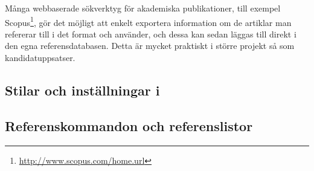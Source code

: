 \documentclass[lang=sv,ptsize=10pt,font=none,nomath,titles=bf,../../a4.tex]{subfiles}
\begin{document}
Många webbaserade sökverktyg för akademiska publikationer, till exempel
Scopus\footnote{\url{http://www.scopus.com/home.url}}, gör det möjligt att
enkelt exportera information om de artiklar man refererar till i det
format \BibTeX{} och  använder, och dessa kan sedan
läggas till direkt i den egna referensdatabasen.
Detta är mycket praktiskt i större projekt så som kandidatuppsatser.

\subsection{Stilar och inställningar i }
\subsection{Referenskommandon och referenslistor}
\end{document}
